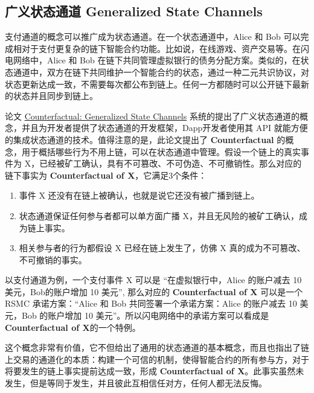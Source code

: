 \begin{appendices}
\subsection{广义状态通道 Generalized State Channels}
支付通道的概念可以推广成为状态通道。在一个状态通道中，Alice 和 Bob 可以完成相对于支付更复杂的链下智能合约功能。比如说，在线游戏、资产交易等。在闪电网络中，Alice 和 Bob 在链下共同管理虚拟银行的债务分配方案。类似的，在状态通道中，双方在链下共同维护一个智能合约的状态，通过一种二元共识协议，对状态更新达成一致，不需要每次都公布到链上。任何一方都随时可以公开链下最新的状态并且同步到链上。

论文 \href{https://www.counterfactual.com/statechannels/}{Counterfactual: Generalized State Channels} 系统的提出了广义状态通道的概念，并且为开发者提供了状态通道的开发框架，Dapp开发者使用其 API 就能方便的集成状态通道的技术。值得注意的是，此论文提出了 \textbf{Counterfactual} 的概念，用于概括哪些行为不用上链，可以在状态通道中管理。假设一个链上的真实事件为 X，已经被矿工确认，具有不可篡改、不可伪造、不可撤销性。那么对应的链下事实为 \textbf{Counterfactual of X}，它满足3个条件：

\begin{enumerate}
    \item 事件 X 还没有在链上被确认，也就是说它还没有被广播到链上。
    \item 状态通道保证任何参与者都可以单方面广播 X，并且无风险的被矿工确认，成为链上事实。
    \item 相关参与者的行为都假设 X 已经在链上发生了，仿佛 X 真的成为不可篡改、不可撤销的事实。
\end{enumerate}

以支付通道为例，一个支付事件 X 可以是 “在虚拟银行中，Alice 的账户减去 10 美元，Bob的账户增加 10 美元”, 那么对应的 \textbf{Counterfactual of X} 可以是一个 RSMC 承诺方案：“Alice 和 Bob 共同签署一个承诺方案：Alice 的账户减去 10 美元，Bob 的账户增加 10 美元”。所以闪电网络中的承诺方案可以看成是\textbf{Counterfactual of X}的一个特例。

这个概念非常有价值，它不但给出了通用的状态通道的基本概念，而且也指出了链上交易的通道化的本质：构建一个可信的机制，使得智能合约的所有参与方，对于将要发生的链上事实提前达成一致，形成 \textbf{Counterfactual of X}。此事实虽然未发生，但是等同于发生，并且彼此互相信任对方，任何人都无法反悔。

\end{appendices}
